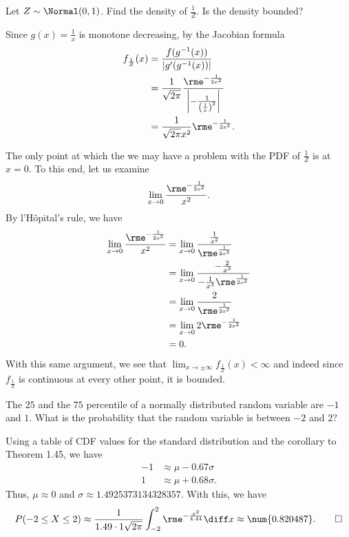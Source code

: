\begin{problem}[Handout 13, \# 21]
  Let \(Z\sim\Normal(0,1)\). Find the density of \(\frac{1}{Z}\). Is the
  density bounded?
\end{problem}
\begin{solution}
  Since \(g(x)=\frac{1}{x}\) is monotone decreasing, by the Jacobian
  formula
  \begin{align*}
    f_{\frac{1}{Z}}(x)
    &=\frac{f(g^{-1}(x))}{|g'(g^{-1}(x))|}\\
    &=\frac{1}{\sqrt{2\pi}}
      \frac{\rme^{-\frac{1}{2x^2}}}{\left|-\frac{1}{\left(\frac{1}{x}\right)^2}
      \right|}\\
    &=\frac{1}{\sqrt{2\pi}x^2}\rme^{-\frac{1}{2x^2}}.
  \end{align*}

  The only point at which the we may have a problem with the PDF of
  \(\frac{1}{Z}\) is at \(x=0\). To this end, let us examine
  \[
    \lim_{x\to 0}\frac{\rme^{-\frac{1}{2x^2}}}{x^2}.
  \]
  By l'Hôpital's rule, we have
  \begin{align*}
    \lim_{x\to 0}\frac{\rme^{-\frac{1}{2x^2}}}{x^2}
    &=\lim_{x\to 0}\frac{\frac{1}{x^2}}{\rme^{\frac{1}{2x^2}}}\\
    &=\lim_{x\to 0}\frac{-\frac{2}{x^3}}{-\frac{1}{x^3}\rme^{\frac{1}{2x^2}}}\\
    &=\lim_{x\to 0}\frac{2}{\rme^{\frac{1}{2x^2}}}\\
    &=\lim_{x\to 0} 2\rme^{-\frac{1}{2x^2}}\\
    &=0.
  \end{align*}
  With this same argument, we see that \(\lim_{x\to\pm\infty}
  f_{\frac{1}{Z}}(x)<\infty\) and indeed since \(f_{\frac{1}{Z}}\) is
  continuous at every other point, it is bounded.
\end{solution}
\newpage

\begin{problem}[Handout 13, \# 22]
  The \(25\) and the \(75\) percentile of a
  normally distributed random variable are \(-1\) and \(1\). What is the
  probability that the random variable is between \(-2\) and \(2\)?
\end{problem}
\begin{solution}
  Using a table of CDF values for the standard distribution and the
  corollary to Theorem 1.45, we have
  \begin{align*}
    -1&\approx \mu-0.67\sigma\\
    1&\approx \mu+0.68\sigma.
  \end{align*}
  Thus, \(\mu\approx 0\) and
  \(\sigma\approx\num{1.4925373134328357}\). With this, we have
  \[
    P(-2\leq X\leq 2)
    \approx\frac{1}{1.49\cdot1\sqrt{2\pi}}\int_{-2}^2\rme^{-\frac{x^2}{4.44}}\diff
    x
    \approx\num{0.820487}.\qedhere
  \]
\end{solution}

